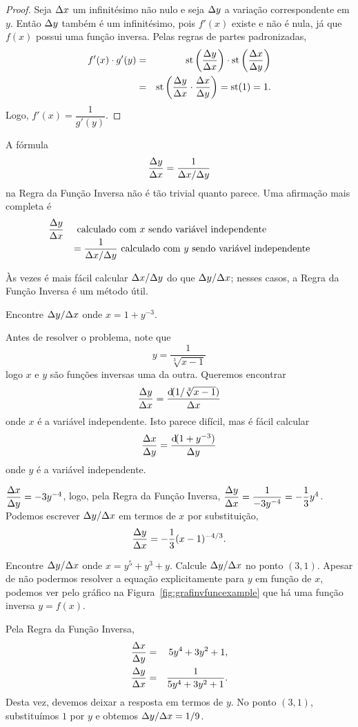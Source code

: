 \begin{proof}
Seja $\Delta x$ um infinitésimo não nulo e seja $\Delta y$ a variação correspondente
em $y$. Então $\Delta y$ também é um infinitésimo, pois $f'(x)$ existe e não é
nula, já que $f(x)$ possui uma função inversa. Pelas regras de partes
padronizadas,
\begin{eqnarray*}
  f'(x) \cdot g'(y) & = & \operatorname{st}\left(\frac{\Delta y}{\Delta x}\right) \cdot \operatorname{st}\left(\frac{\Delta x}{\Delta y}\right) \\
  & = & \operatorname{st}\left(\frac{\Delta y}{\Delta x} \cdot \frac{\Delta x}{\Delta y}\right) = \operatorname{st}(1) = 1.
\end{eqnarray*}
Logo, $f'(x) = \dfrac{1}{g'(y)}$.
\end{proof}

A fórmula
$$
  \frac{\Delta{y}}{\Delta{x}} = \frac{1}{\Delta{x}/\Delta{y}}
$$
na Regra da Função Inversa não é tão trivial quanto parece. Uma afirmação
mais completa é
$$
  \begin{array}{rl}
  \dfrac{\Delta{y}}{\Delta{x}} & \text{ calculado com $x$ sendo variável independente} \\
                  & = \dfrac{1}{\Delta{x}/\Delta{y}} \text{ calculado com $y$ sendo variável independente}
  \end{array}
$$

Às vezes é mais fácil calcular $\Delta{x}/\Delta{y}$ do que $\Delta{y}/\Delta{x}$; nesses casos, a
Regra da Função Inversa é um método útil.

\begin{example}
Encontre $\Delta{y}/\Delta{x}$ onde $x = 1 + y^{-3}$.

Antes de resolver o problema, note que
$$
  y = \frac{1}{\sqrt[3]{x-1}}
$$
logo $x$ e $y$ são funções inversas uma da outra. Queremos encontrar
$$
  \frac{\dy}{\dx} = \frac{\dif(1/\sqrt[3]{x - 1})}{\dx}
$$
onde $x$ é a variável independente. Isto parece difícil, mas é fácil
calcular
$$
  \frac{\dx}{\dy} = \frac{\dif(1 + y^{-3})}{\dy}
$$
onde $y$ é a variável independente.

\begin{exsolution} $\dfrac{\Delta{x}}{\Delta{y}} = -3y^{-4}$, logo, pela Regra da
Função Inversa, $\dfrac{\Delta{y}}{\Delta{x}} = \dfrac{1}{-3y^{-4}} = -\dfrac{1}{3}y^4$.
Podemos escrever $\Delta{y}/\Delta{x}$ em termos de $x$ por substituição,
$$
  \frac{\Delta{y}}{\Delta{x}} = -\frac{1}{3}(x - 1)^{-4/3}.
$$
\end{exsolution}
\end{example}

\begin{example}
Encontre $\Delta{y}/\Delta{x}$ onde $x = y^5 + y^3 + y$. Calcule $\Delta{y}/\Delta{x}$ no ponto
$(3, 1)$. Apesar de não podermos resolver a equação explicitamente para
$y$ em função de $x$, podemos ver pelo gráfico na
Figura~\ref{fig:grafinvfuncexample} que há uma função inversa $y = f(x)$.


Pela Regra da Função Inversa,
\begin{eqnarray*}
  \frac{\Delta{x}}{\Delta{y}} & = & 5y^4 + 3y^2 + 1, \\
  \frac{\Delta{y}}{\Delta{x}} & = & \frac{1}{5y^4 + 3y^2 + 1}.
\end{eqnarray*}
Desta vez, devemos deixar a resposta em termos de $y$. No ponto $(3, 1)$,
substituímos $1$ por $y$ e obtemos $\Delta{y}/\Delta{x} = 1/9$.
\end{example}

